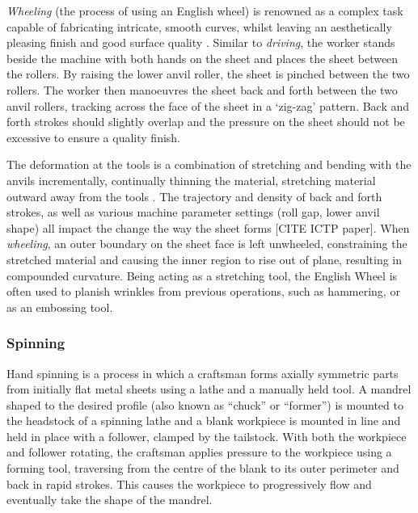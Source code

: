 \textit{Wheeling} (the process of using an English wheel) is renowned as a complex task capable of fabricating intricate, smooth curves, whilst leaving an aesthetically pleasing finish and good surface quality \citep{Longyard2014LearningWheel}. Similar to \textit{driving}, the worker stands beside the machine with both hands on the sheet and places the sheet between the rollers. By raising the lower anvil roller, the sheet is pinched between the two rollers. The worker then manoeuvres the sheet back and forth between the two anvil rollers, tracking across the face of the sheet in a `zig-zag' pattern. Back and forth strokes should slightly overlap and the pressure on the sheet should not be excessive to ensure a quality finish. 

The deformation at the tools is a combination of stretching and bending with the anvils incrementally, continually thinning the material, stretching material outward away from the tools \citep{Music2012TheTools}. The trajectory and density of back and forth strokes, as well as various machine parameter settings (roll gap, lower anvil shape) all impact the change the way the sheet forms [CITE ICTP paper]. When \textit{wheeling}, an outer boundary on the sheet face is left unwheeled, constraining the stretched material and causing the inner region to rise out of plane, resulting in compounded curvature. Being acting as a stretching tool, the English Wheel is often used to planish wrinkles from previous operations, such as hammering, or as an embossing tool.


\subsubsection*{Spinning}
Hand spinning is a process in which a craftsman forms axially symmetric parts from initially flat metal sheets using a lathe and a manually held tool. A mandrel shaped to the desired profile (also known as “chuck” or “former”) is mounted to the headstock of a spinning lathe and a blank workpiece is mounted in line and held in place with a follower, clamped by the tailstock. With both the workpiece and follower rotating, the craftsman applies pressure to the workpiece using a forming tool, traversing from the centre of the blank to its outer perimeter and back in rapid strokes. This causes the workpiece to progressively flow and eventually take the shape of the mandrel. 

